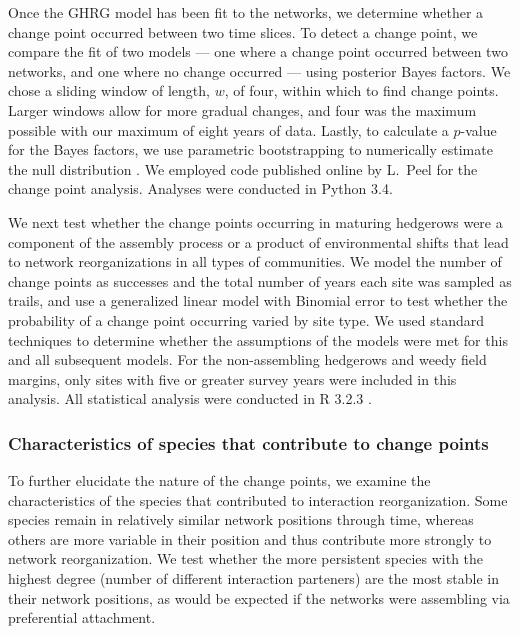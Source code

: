 \documentclass[12pt]{article}
\begin{document}
Once the GHRG model has been fit to the networks, we determine whether
a change point occurred between two time slices. To detect a change
point, we compare the fit of two models --- one where a change point
occurred between two networks, and one where no change occurred ---
using posterior Bayes factors. We chose a sliding window of length,
$w$, of four, within which to find change points. Larger windows allow
for more gradual changes, and four was the maximum possible with our
maximum of eight years of data. Lastly, to calculate a $p$-value for
the Bayes factors, we use parametric bootstrapping to numerically
estimate the null distribution \citep{peel2014detecting}. We employed
code published online by L.~Peel for the change point
analysis. Analyses were conducted in Python 3.4.

We next test whether the change points occurring in maturing hedgerows
were a component of the assembly process or a product of environmental
shifts that lead to network reorganizations in all types of
communities. We model the number of change points as successes and the
total number of years each site was sampled as trails, and use a
generalized linear model with Binomial error to test whether the
probability of a change point occurring varied by site type. We used
standard techniques to determine whether the assumptions of the models
were met for this and all subsequent models. For the non-assembling
hedgerows and weedy field margins, only sites with five or greater
survey years were included in this analysis. All statistical analysis
were conducted in R 3.2.3 \citep{R}.

\subsubsection*{Characteristics of species that contribute to change
  points}

To further elucidate the nature of the change points, we examine the
characteristics of the species that contributed to interaction
reorganization. Some species remain in relatively similar network
positions through time, whereas others are more variable in their
position and thus contribute more strongly to network
reorganization. We test whether the more persistent species with the
highest degree (number of different interaction parteners) are the
most stable in their network positions, as would be expected if the
networks were assembling via preferential attachment.
\end{document}
